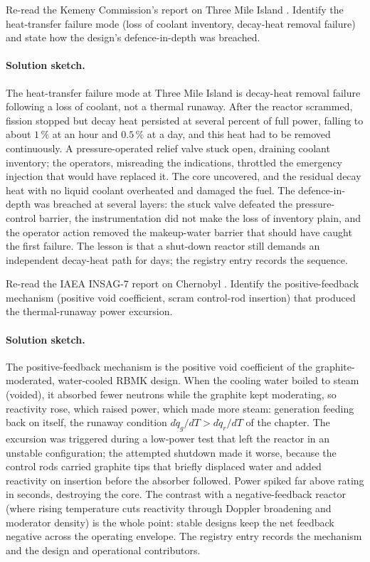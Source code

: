 \begin{exercise}
Re-read the Kemeny Commission's report on Three Mile Island
\cite{acc:kemeny-tmi-1979}. Identify the heat-transfer failure mode
(loss of coolant inventory, decay-heat removal failure) and state
how the design's defence-in-depth was breached.
\paragraph{Solution sketch.} The heat-transfer failure mode at Three
Mile Island is decay-heat removal failure following a loss of coolant,
not a thermal runaway. After the reactor scrammed, fission stopped but
decay heat persisted at several percent of full power, falling to about
$1\,\%$ at an hour and $0.5\,\%$ at a day, and this heat had to be
removed continuously. A pressure-operated relief valve stuck open,
draining coolant inventory; the operators, misreading the indications,
throttled the emergency injection that would have replaced it. The core
uncovered, and the residual decay heat with no liquid coolant overheated
and damaged the fuel. The defence-in-depth was breached at several
layers: the stuck valve defeated the pressure-control barrier, the
instrumentation did not make the loss of inventory plain, and the
operator action removed the makeup-water barrier that should have caught
the first failure. The lesson is that a shut-down reactor still demands
an independent decay-heat path for days; the registry entry
\cite{acc:kemeny-tmi-1979} records the sequence.
\end{exercise}

\begin{exercise}
Re-read the IAEA INSAG-7 report on Chernobyl
\cite{acc:iaea-insag7-1992}. Identify the positive-feedback mechanism
(positive void coefficient, scram control-rod insertion) that
produced the thermal-runaway power excursion.
\paragraph{Solution sketch.} The positive-feedback mechanism is the
positive void coefficient of the graphite-moderated, water-cooled RBMK
design. When the cooling water boiled to steam (voided), it absorbed
fewer neutrons while the graphite kept moderating, so reactivity rose,
which raised power, which made more steam: generation feeding back on
itself, the runaway condition $d\dot{q}_g/dT > d\dot{q}_r/dT$ of the
chapter. The excursion was triggered during a low-power test that left
the reactor in an unstable configuration; the attempted shutdown made it
worse, because the control rods carried graphite tips that briefly
displaced water and added reactivity on insertion before the absorber
followed. Power spiked far above rating in seconds, destroying the core.
The contrast with a negative-feedback reactor (where rising temperature
cuts reactivity through Doppler broadening and moderator density) is the
whole point: stable designs keep the net feedback negative across the
operating envelope. The registry entry \cite{acc:iaea-insag7-1992}
records the mechanism and the design and operational contributors.
\end{exercise}

